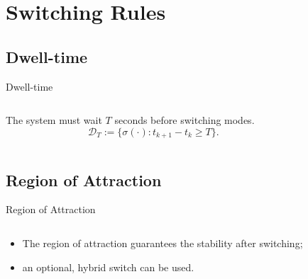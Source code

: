 
\section{Switching Rules}%
\label{sec:switching-rules}

\subsection{Dwell-time}%
\label{subsec:dwell-time}

\begin{slide}{Dwell-time}
  \begin{columns}[c]
    \begin{column}{0.48\textwidth}
      The system must wait \(T\) seconds before switching modes.
      \begin{equation}
        \mathcal{D}_{T} := \{\sigma(\cdot):t_{k+1}-t_{k}\ge{}T\}.
      \end{equation}
    \end{column}%
    \hfill%
    \begin{column}{0.48\textwidth}
      
    \end{column}%
  \end{columns}
\end{slide}

\subsection{Region of Attraction}%
\label{subsec:roa-rule}

\begin{slide}{Region of Attraction}
  \begin{columns}[c]
    \begin{column}{0.48\textwidth}
      \begin{itemize}
        \item The region of attraction guarantees the stability after switching;
        \item an optional, hybrid switch can be used.
      \end{itemize}
    \end{column}%
    \hfill%
    \begin{column}{0.48\textwidth}
      
    \end{column}%
  \end{columns}
\end{slide}
